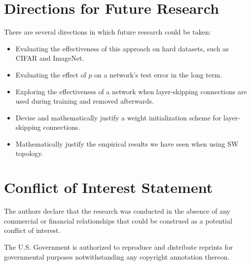 \documentclass[utf8]{frontiersSCNS}
\begin{document}
\section{Directions for Future Research}

There are several directions in which future research could be taken:
\begin{itemize} 
\item Evaluating the effectiveness of this approach on hard datasets, such as CIFAR and ImageNet.
\item Evaluating the effect of $p$ on a network's test error in the long term.
\item Exploring the effectiveness of a network when layer-skipping connections are used during training and removed afterwards.
\item Devise and mathematically justify a weight initialization scheme for layer-skipping connections.
\item Mathematically justify the empirical results we have seen when using SW topology.
\end{itemize}

\section*{Conflict of Interest Statement}

The authors declare that the research was conducted in the absence of any commercial or financial relationships that could be construed as a potential conflict of interest.

The U.S. Government is authorized to reproduce and distribute reprints for governmental purposes notwithstanding any copyright annotation thereon.
%
%
%
%

\end{document}
